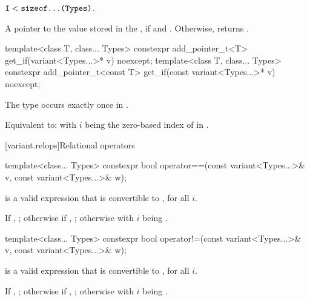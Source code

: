 \begin{itemdescr}
\pnum
\mandates
$\texttt{I} < \texttt{sizeof...(Types)}$.

\pnum
\returns
A pointer to the value stored in the , if 
and . Otherwise, returns .
\end{itemdescr}

%
%
\begin{itemdecl}
template<class T, class... Types>
  constexpr add_pointer_t<T>
    get_if(variant<Types...>* v) noexcept;
template<class T, class... Types>
  constexpr add_pointer_t<const T>
    get_if(const variant<Types...>* v) noexcept;
\end{itemdecl}

\begin{itemdescr}
\pnum
\mandates
The type  occurs exactly once in .

\pnum
\effects
Equivalent to:  with $i$ being the zero-based
index of  in .
\end{itemdescr}

[variant.relops]{Relational operators}

%
\begin{itemdecl}
template<class... Types>
  constexpr bool operator==(const variant<Types...>& v, const variant<Types...>& w);
\end{itemdecl}

\begin{itemdescr}
\pnum
\mandates
{} is a valid expression that is
convertible to , for all $i$.

\pnum
\returns
If , ;
otherwise if , ;
otherwise  with $i$ being .
\end{itemdescr}

%
\begin{itemdecl}
template<class... Types>
  constexpr bool operator!=(const variant<Types...>& v, const variant<Types...>& w);
\end{itemdecl}

\begin{itemdescr}
\pnum
\mandates
{} is a valid expression that is
convertible to , for all $i$.

\pnum
\returns
If , ;
otherwise if , ;
otherwise  with $i$ being .
\end{itemdescr}

